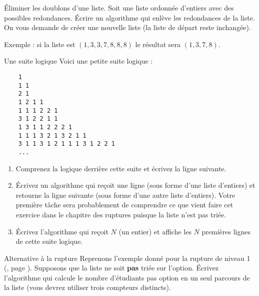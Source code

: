 \begin{Exercice}{Éliminer les doublons d'une liste.}
	Soit une liste ordonnée d'entiers avec des possibles redondances. 
	Écrire un algorithme qui enlève les redondances de la liste. 
	On vous demande de créer une nouvelle liste (la liste de départ reste inchangée).
	
	Exemple : si la liste est $(1, 3, 3, 7, 8, 8, 8)$ 
	le résultat sera $(1, 3, 7, 8)$.
\end{Exercice}

\begin{Exercice}{Une suite logique}
	Voici une petite suite logique :
	
	\begin{minipage}{5cm}
		\small
		\begin{verbatim}
	1
	1 1
	2 1
	1 2 1 1
	1 1 1 2 2 1
	3 1 2 2 1 1
	1 3 1 1 2 2 2 1
	1 1 1 3 2 1 3 2 1 1
	3 1 1 3 1 2 1 1 1 3 1 2 2 1
	...
		\end{verbatim}
	\end{minipage}
	\begin{minipage}{9cm}
		\begin{enumerate}[label=\alph*)]
		\item
			Comprenez la logique derrière cette suite 
			et écrivez la ligne suivante.
		\item
			Écrivez un algorithme qui reçoit une ligne 
			(sous forme d'une liste d'entiers) 
			et retourne la ligne suivante 
			(sous forme d'une autre liste d'entiers).
			Votre première tâche sera probablement de comprendre 
			ce que vient faire cet exercice dans le chapitre des ruptures puisque la liste n'est pas triée.
		\item
			Écrivez l'algorithme qui reçoit $N$ (un entier) 
			et affiche les $N$ premières lignes de cette suite logique.	
		\end{enumerate}
	\end{minipage}
\end{Exercice}

\begin{Exercice}{Alternative à la rupture}
	Reprenons l'exemple donné pour la rupture de niveau 1 (, page \pageref{algo:rupt1}).
	Supposons que la liste ne soit \textbf{pas} triée sur l'option.
	Écrivez l'algorithme qui calcule le nombre d'étudiants pas option en un seul parcours de la liste
	(vous devrez utiliser trois compteurs distincts).
\end{Exercice}
